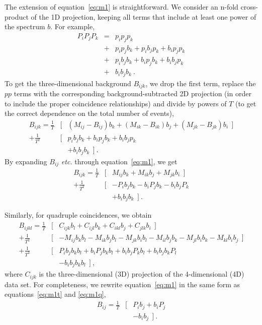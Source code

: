 The extension of equation~\ref{eq:m1} is straightforward. We consider an
n-fold cross-product of the 1D projection, keeping all terms that include at
least one power of the spectrum $b$. For example,
\begin{eqnarray*}
P_i P_j P_k & = & p_i p_j p_k \\
            & + & p_i p_j b_k + p_i b_j p_k + b_i p_j p_k \\
            & + & p_i b_j b_k + b_i p_j b_k + b_i b_j p_k \\
            & + & b_i b_j b_k \ .
\end{eqnarray*}
To get the three-dimensional background $B_{ijk}$, we drop the first term,
replace the $pp$ terms with the corresponding background-subtracted 2D
projection (in order to include the proper coincidence relationships) and
divide by powers of $T$ (to get the correct dependence on the total number of
events),
\begin{eqnarray*}
B_{ijk} =  \frac {1} {T} 
  & [ & (M_{ij}-B_{ij}) b_k + (M_{ik}-B_{ik}) b_j + (M_{jk}-B_{jk}) b_i \ \ ] \\
+  \frac {1} {T^2} 
  & [ & p_i b_j b_k + b_i p_j b_k + b_i b_j p_k \\
  &   & + b_i b_j b_k \ \ ] \ .
\end{eqnarray*}
By expanding $B_{ij}$ {\em etc.} through equation~\ref{eq:m1}, we get
\begin{eqnarray}
B_{ijk} = \frac {1}{T}
 & [ & M_{ij}b_k + M_{ik}b_j + M_{jk}b_i \ \ ]     \nonumber \\
+ \frac {1}{T^2} 
 & [ & - P_i b_j b_k - b_i P_j b_k - b_i b_j P_k   \nonumber \\
 &   & + b_i b_j b_k \ \ ] \ .                     \label{eq:m1t} 
\end{eqnarray}

Similarly, for quadruple coincidences, we obtain
\begin{eqnarray}
B_{ijkl} = \frac {1} {T} 
 & [ & C_{ijk}b_l + C_{ijl}b_k + C_{ikl}b_j + C_{jlk}b_i \ \ ]  \nonumber \\
+ \frac {1} {T^2} 
 & [ & - M_{ij} b_k b_l - M_{ik} b_j b_l - M_{jk} b_i b_l
       - M_{il} b_j b_k - M_{jl} b_i b_k - M_{kl} b_i b_j \ \ ] \nonumber \\
+ \frac {1} {T^3} 
 & [ & P_i b_j b_k b_l + b_i P_j b_k b_l +
       b_i b_j P_k b_l + b_i b_j b_k P_l                        \nonumber \\
 &   & - b_i b_j b_k b_l \ \ ] \ ,                              \label{eq:m1q}
\end{eqnarray}
where $C_{ijk}$ is the three-dimensional (3D) projection of the 4-dimensional
(4D) data set.
For completeness, we rewrite equation~\ref{eq:m1} in the same form as
equations~\ref{eq:m1t} and \ref{eq:m1q},
\begin{eqnarray*}
B_{ij} = \frac {1} {T}
  & [ & P_i b_j + b_i P_j \\
  &   & - b_i b_j \ \ ] \ .
\end{eqnarray*}

